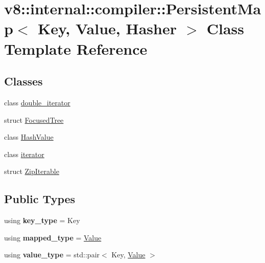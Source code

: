\hypertarget{classv8_1_1internal_1_1compiler_1_1PersistentMap}{}\section{v8\+:\+:internal\+:\+:compiler\+:\+:Persistent\+Map$<$ Key, Value, Hasher $>$ Class Template Reference}
\label{classv8_1_1internal_1_1compiler_1_1PersistentMap}
\subsection*{Classes}
\begin{DoxyCompactItemize}
\item 
class \mbox{\hyperlink{classv8_1_1internal_1_1compiler_1_1PersistentMap_1_1double__iterator}{double\+\_\+iterator}}
\item 
struct \mbox{\hyperlink{structv8_1_1internal_1_1compiler_1_1PersistentMap_1_1FocusedTree}{Focused\+Tree}}
\item 
class \mbox{\hyperlink{classv8_1_1internal_1_1compiler_1_1PersistentMap_1_1HashValue}{Hash\+Value}}
\item 
class \mbox{\hyperlink{classv8_1_1internal_1_1compiler_1_1PersistentMap_1_1iterator}{iterator}}
\item 
struct \mbox{\hyperlink{structv8_1_1internal_1_1compiler_1_1PersistentMap_1_1ZipIterable}{Zip\+Iterable}}
\end{DoxyCompactItemize}
\subsection*{Public Types}
\begin{DoxyCompactItemize}
\item 
\mbox{\label{classv8_1_1internal_1_1compiler_1_1PersistentMap_a06dac7a393de6ee974f9dddbc0ae4f25}} 
using {\bfseries key\+\_\+type} = Key
\item 
\mbox{\label{classv8_1_1internal_1_1compiler_1_1PersistentMap_abee17049ae031cffeff6853a10a96a80}} 
using {\bfseries mapped\+\_\+type} = \mbox{\hyperlink{classv8_1_1Value}{Value}}
\item 
\mbox{\label{classv8_1_1internal_1_1compiler_1_1PersistentMap_a3aec4838ee841b7257d796939b67761c}} 
using {\bfseries value\+\_\+type} = std\+::pair$<$ Key, \mbox{\hyperlink{classv8_1_1Value}{Value}} $>$
\end{DoxyCompactItemize}
